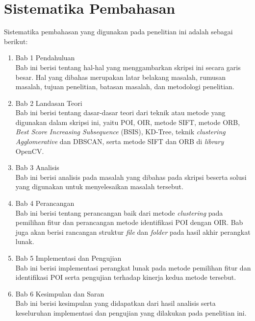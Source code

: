\section{Sistematika Pembahasan}
\label{sec:sispem}
Sistematika pembahasan yang digunakan pada penelitian ini adalah sebagai berikut:
\begin{enumerate}
	\item Bab 1 Pendahuluan \\
	Bab ini berisi tentang hal-hal yang menggambarkan skripsi ini secara garis besar. Hal yang dibahas merupakan latar belakang masalah, rumusan masalah, tujuan penelitian, batasan masalah, dan metodologi penelitian.
	\item Bab 2 Landasan Teori \\
	Bab ini berisi tentang dasar-dasar teori dari teknik atau metode yang digunakan dalam skripsi ini, yaitu POI, OIR, metode SIFT, metode ORB, \textit{Best Score Increasing Subsequence} (BSIS), KD-Tree, teknik \textit{clustering} \textit{Agglomerative} dan DBSCAN, serta metode SIFT dan ORB di \textit{library} OpenCV.
	\item Bab 3 Analisis \\
	Bab ini berisi analisis pada masalah yang dibahas pada skripsi beserta solusi yang digunakan untuk menyelesaikan masalah tersebut.
	\item Bab 4 Perancangan \\
	Bab ini berisi tentang perancangan baik dari metode \textit{clustering} pada pemilihan fitur dan perancangan metode identifikasi POI dengan OIR. Bab juga akan berisi rancangan struktur \textit{file} dan \textit{folder} pada hasil akhir perangkat lunak.
	\item Bab 5 Implementasi dan Pengujian \\
	Bab ini berisi implementasi perangkat lunak pada metode pemilihan fitur dan identifikasi POI serta pengujian terhadap kinerja kedua metode tersebut.
	\item Bab 6 Kesimpulan dan Saran \\
	Bab ini berisi kesimpulan yang didapatkan dari hasil analisis serta keseluruhan implementasi dan pengujian yang dilakukan pada penelitian ini.
\end{enumerate}